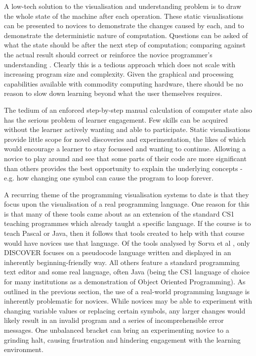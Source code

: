 A low-tech solution to the visualisation and understanding problem is to draw the whole state of the machine after each operation. These static visualisations can be presented to novices to demonstrate the changes caused by each, and to demonstrate the deterministic nature of computation. Questions can be asked of what the state should be after the next step of computation; comparing against the actual result should correct or reinforce the novice programmer's understanding \cite{1612204}. Clearly this is a tedious approach which does not scale with increasing program size and complexity. Given the graphical and processing capabilities available with commodity computing hardware, there should be no reason to slow down learning beyond what the user themselves requires.

The tedium of an enforced step-by-step manual calculation of computer state also has the serious problem of learner engagement. Few skills can be acquired without the learner actively wanting and able to participate. Static visualisations provide little scope for novel discoveries and experimentation, the likes of which would encourage a learner to stay focussed and wanting to continue. Allowing a novice to play around and see that some parts of their code are more significant than others provides the best opportunity to explain the underlying concepts - e.g. how changing one symbol can cause the program to loop forever.

A recurring theme of the programming visualisation systems to date is that they focus upon the visualisation of a real programming language. One reason for this is that many of these tools came about as an extension of the standard CS1 teaching programmes which already taught a specific language. If the course is to teach Pascal or Java, then it follows that tools created to help with that course would have novices use that language. Of the tools analysed by Sorva et al \cite{Sorva:2013:RGP:2543488.2490822}, only DISCOVER focuses on a pseudocode language written and displayed in an inherently beginning-friendly way. All others feature a standard programming text editor and some real language, often Java (being the CS1 language of choice for many institutions as a demonstration of Object Oriented Programming). As outlined in the previous section, the use of a real-world programming language is inherently problematic for novices. While novices may be able to experiment with changing variable values or replacing certain symbols, any larger changes would likely result in an invalid program and a series of incomprehensible error messages. One unbalanced bracket can bring an experimenting novice to a grinding halt, causing frustration and hindering engagement with the learning environment.

